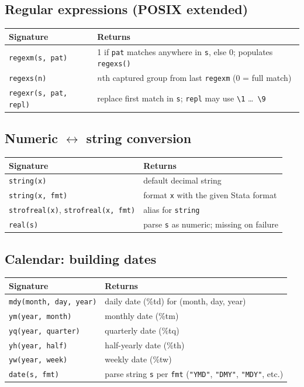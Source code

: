 \documentclass[11pt,letterpaper]{article}
\begin{document}
\subsection{Regular expressions (POSIX extended)}

\begin{center}
\begin{tabular}{ll}
\toprule
Signature & Returns \\
\midrule
\texttt{regexm(s, pat)} & 1 if \texttt{pat} matches anywhere in \texttt{s}, else 0; populates \texttt{regexs()} \\
\texttt{regexs(n)} & $n$th captured group from last \texttt{regexm} (0 = full match) \\
\texttt{regexr(s, pat, repl)} & replace first match in \texttt{s}; \texttt{repl} may use \texttt{\textbackslash 1} \ldots\ \texttt{\textbackslash 9} \\
\bottomrule
\end{tabular}
\end{center}

\subsection{Numeric $\leftrightarrow$ string conversion}

\begin{center}
\begin{tabular}{ll}
\toprule
Signature & Returns \\
\midrule
\texttt{string(x)} & default decimal string \\
\texttt{string(x, fmt)} & format \texttt{x} with the given Stata format \\
\texttt{strofreal(x)}, \texttt{strofreal(x, fmt)} & alias for \texttt{string} \\
\texttt{real(s)} & parse \texttt{s} as numeric; missing on failure \\
\bottomrule
\end{tabular}
\end{center}

\subsection{Calendar: building dates}

\begin{center}
\begin{tabular}{ll}
\toprule
Signature & Returns \\
\midrule
\texttt{mdy(month, day, year)} & daily date (\%td) for (month, day, year) \\
\texttt{ym(year, month)} & monthly date (\%tm) \\
\texttt{yq(year, quarter)} & quarterly date (\%tq) \\
\texttt{yh(year, half)} & half-yearly date (\%th) \\
\texttt{yw(year, week)} & weekly date (\%tw) \\
\texttt{date(s, fmt)} & parse string \texttt{s} per \texttt{fmt} (\texttt{"YMD"}, \texttt{"DMY"}, \texttt{"MDY"}, etc.) \\
\bottomrule
\end{tabular}
\end{center}
\end{document}
